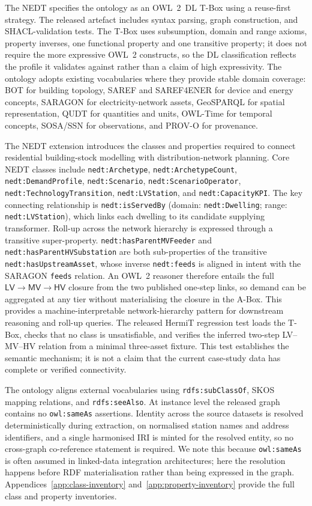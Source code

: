 \documentclass[preprint,12pt]{elsarticle}
\begin{document}
The NEDT specifies the ontology as an OWL~2~DL T-Box using a reuse-first
strategy. The released artefact includes syntax parsing, graph construction,
and SHACL-validation tests. The T-Box uses subsumption, domain and range axioms, property
inverses, one functional property and one transitive property; it does not
require the more expressive OWL~2 constructs, so the DL classification
reflects the profile it validates against rather than a claim of high
expressivity.
The ontology adopts existing vocabularies where they provide stable domain
coverage: BOT for building topology, SAREF and SAREF4ENER for device and
energy concepts, SARAGON for electricity-network assets, GeoSPARQL for
spatial representation, QUDT for quantities and units, OWL-Time for temporal
concepts, SOSA/SSN for observations, and PROV-O for provenance.

The NEDT extension introduces the classes and properties required to connect
residential building-stock modelling with distribution-network planning.
Core NEDT classes include \texttt{nedt:Archetype},
\texttt{nedt:ArchetypeCount}, \texttt{nedt:DemandProfile},
\texttt{nedt:Scenario}, \texttt{nedt:ScenarioOperator},
\texttt{nedt:TechnologyTransition}, \texttt{nedt:LVStation}, and
\texttt{nedt:CapacityKPI}.
The key connecting relationship is \texttt{nedt:isServedBy}
(domain: \texttt{nedt:Dwelling}; range: \texttt{nedt:LVStation}), which
links each dwelling to its candidate supplying transformer.
Roll-up across the network hierarchy is expressed through a transitive
super-property. \texttt{nedt:hasParentMVFeeder} and
\texttt{nedt:hasParentHVSubstation} are both sub-properties of the transitive
\texttt{nedt:hasUpstreamAsset}, whose inverse \texttt{nedt:feeds} is aligned
in intent with the SARAGON \texttt{feeds} relation. An OWL~2 reasoner
therefore entails the full $\mathsf{LV} \to \mathsf{MV} \to \mathsf{HV}$
closure from the two published one-step links, so demand can be aggregated at
any tier without materialising the closure in the A-Box. This provides a
machine-interpretable network-hierarchy pattern for downstream reasoning and
roll-up queries. The released HermiT regression test loads the T-Box,
checks that no class is unsatisfiable, and verifies the inferred two-step
LV--MV--HV relation from a minimal three-asset fixture. This test establishes
the semantic mechanism; it is not a claim that the current case-study data
has complete or verified connectivity.

The ontology aligns external vocabularies using \texttt{rdfs:subClassOf},
SKOS mapping relations, and \texttt{rdfs:seeAlso}.
At instance level the released graph contains no \texttt{owl:sameAs}
assertions. Identity across the source datasets is resolved deterministically
during extraction, on normalised station names and address identifiers, and a
single harmonised IRI is minted for the resolved entity, so no cross-graph
co-reference statement is required. We note this because
\texttt{owl:sameAs} is often assumed in linked-data integration
architectures; here the resolution happens before RDF materialisation rather
than being expressed in the graph.
Appendices~\ref{app:class-inventory} and~\ref{app:property-inventory}
provide the full class and property inventories.
\end{document}
